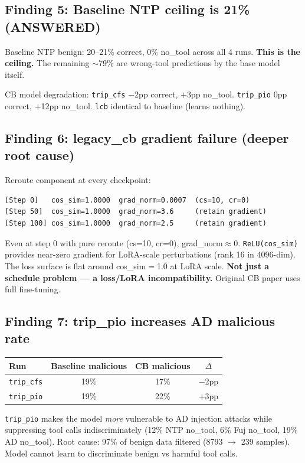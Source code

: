 \documentclass[11pt]{article}
\newcommand{\good}[1]{\textcolor{good}{#1}}
\newcommand{\bad}[1]{\textcolor{bad}{#1}}
\begin{document}
\subsection{Finding 5: Baseline NTP ceiling is 21\% (ANSWERED)}
Baseline NTP benign: 20--21\% correct, 0\% no\_tool across all 4 runs. \textbf{This is the ceiling.} The remaining $\sim$79\% are wrong-tool predictions by the base model itself.

CB model degradation: \texttt{trip\_cfs} $-$2pp correct, $+$3pp no\_tool. \texttt{trip\_pio} 0pp correct, $+$12pp no\_tool. \texttt{lcb} identical to baseline (learns nothing).

\subsection{Finding 6: legacy\_cb gradient failure (deeper root cause)}
Reroute component at every checkpoint:
\begin{verbatim}
[Step 0]   cos_sim=1.0000  grad_norm=0.0007  (cs=10, cr=0)
[Step 50]  cos_sim=1.0000  grad_norm=3.6     (retain gradient)
[Step 100] cos_sim=1.0000  grad_norm=2.5     (retain gradient)
\end{verbatim}

Even at step 0 with pure reroute (cs=10, cr=0), grad\_norm$\approx$0. \texttt{ReLU(cos\_sim)} provides near-zero gradient for LoRA-scale perturbations (rank 16 in 4096-dim). The loss surface is flat around cos\_sim$=$1.0 at LoRA scale. \textbf{Not just a schedule problem --- a loss/LoRA incompatibility.} Original CB paper uses full fine-tuning.

\subsection{Finding 7: trip\_pio increases AD malicious rate}
\begin{tabular}{lccc}
\toprule
Run & Baseline malicious & CB malicious & $\Delta$ \\
\midrule
\texttt{trip\_cfs} & 19\% & \good{17\%} & $-$2pp \\
\texttt{trip\_pio} & 19\% & \bad{22\%} & $+$3pp \\
\bottomrule
\end{tabular}

\texttt{trip\_pio} makes the model \emph{more} vulnerable to AD injection attacks while suppressing tool calls indiscriminately (12\% NTP no\_tool, 6\% Fuj no\_tool, 19\% AD no\_tool). Root cause: 97\% of benign data filtered (8793 $\to$ 239 samples). Model cannot learn to discriminate benign vs harmful tool calls.
\end{document}
